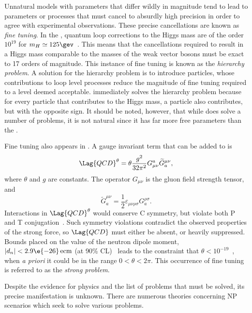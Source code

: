 Unnatural \np models with parameters that differ wildly in magnitude tend to
lead to parameters or processes that must cancel to absurdly
high precision in order to agree with experimental observations.
These precise cancellations are known as \emph{fine tuning}.
In the \sm, quantum loop corrections to the Higgs mass are of the order $10^{19}$
for $m_H\simeq125\gev$~\cite{Chatrchyan:2012ufa,Aad:2012tfa}.
This means that the cancellations required to result in a Higgs mass comparable to the masses of
the weak vector bosons must be exact to 17 orders of magnitude.
This instance of fine tuning is known as the \emph{hierarchy problem}.
A solution for the hierarchy problem is to introduce \np particles, whose contributions to
loop level processes reduce the magnitude of fine tuning required to a level deemed
acceptable.
\SUSY immediately solves the hierarchy problem because for every \sm particle that
contributes to the Higgs mass, a \SUSY particle also contributes, but with the opposite sign.
It should be noted, however, that while \SUSY does solve a number of problems, it is not natural
since it has far more free parameters than the \sm.

Fine tuning also appears in \QCD.
A gauge invariant term that can be added to  is
\begin{equation}
  \Lag{QCD}^\theta = \theta\frac{g^2}{32\pi^2}
  G_{\mu\nu}^a\widetilde G^{\mu\nu}_a,
  \label{eq:strongcp}
\end{equation}
where $\theta$ and $g$ are constants.
The operator $G_{\mu\nu}$ is the gluon field strength tensor, and
\begin{equation}
  \widetilde G^{\mu\nu}_a = \frac12\varepsilon_{\mu\nu\rho\sigma}G^{\rho\sigma}_a.
\end{equation}
Interactions in $\Lag{QCD}^\theta$ would conserve \gls{C} symmetry, but violate both \gls{P} and
\gls{T} conjugation~\cite{Peccei:2006as}.
Such symmetry violations contradict the observed properties of the strong
force, so $\Lag{QCD}$ must either be absent, or heavily suppressed.
Bounds placed on the value of the neutron dipole moment, $|d_n| <2.9\e{-26}\,\mathrm{ecm}$
(at 90\% CL)~\cite{Baker:2006ts} leads to the constraint that
$\theta<10^{-19}$~\cite{Crewther:PQref9}, when \emph{a priori} it could be in the range
$0<\theta<2\pi$.
This occurrence of fine tuning is referred to as the \emph{strong \CP problem}.

Despite the evidence for \bsm physics and the list of problems that must be solved, its precise
manifestation is unknown.
There are numerous theories concerning NP scenarios which seek to solve various problems.

